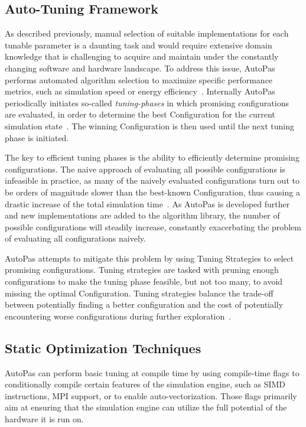 \documentclass[conference]{IEEEtran}
\begin{document}
\subsection{Auto-Tuning Framework}

As described previously, manual selection of suitable implementations for each tunable parameter is a daunting task and would require extensive domain knowledge that is challenging to acquire and maintain under the constantly changing software and hardware landscape. To address this issue, AutoPas performs automated algorithm selection to maximize specific performance metrics, such as simulation speed or energy efficiency~\cite{Gratl2022AutoPas}. Internally AutoPas periodically initiates so-called \textit{tuning-phases} in which promising configurations are evaluated, in order to determine the best Configuration for the current simulation state~\cite{Gratl2019AutoPas}. The winning Configuration is then used until the next tuning phase is initiated.

The key to efficient tuning phases is the ability to efficiently determine promising configurations. The naive approach of evaluating all possible configurations is infeasible in practice, as many of the naively evaluated configurations turn out to be orders of magnitude slower than the best-known Configuration, thus causing a drastic increase of the total simulation time~\cite{endreport.pdf}\cite{Manuel_Lerchner_Thesis.pdf}.
As AutoPas is developed further and new implementations are added to the algorithm library, the number of possible configurations will steadily increase, constantly exacerbating the problem of evaluating all configurations naively.

AutoPas attempts to mitigate this problem by using Tuning Strategies to select promising configurations. Tuning strategies are tasked with pruning enough configurations to make the tuning phase feasible, but not too many, to avoid missing the optimal Configuration.
Tuning strategies balance the trade-off between potentially finding a better configuration and the cost of potentially encountering worse configurations during further exploration~\cite{Newcome2023Poster}.




\subsection{Static Optimization Techniques}

AutoPas can perform basic tuning at compile time by using compile-time flags to conditionally compile certain features of the simulation engine, such as SIMD instructions, MPI support, or to enable auto-vectorization. Those flags primarily aim at ensuring that the simulation engine can utilize the full potential of the hardware it is run on.
\end{document}
